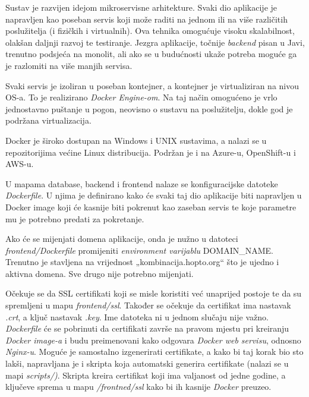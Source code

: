 	
		
		Sustav je razvijen idejom mikroservisne arhitekture. Svaki dio aplikacije je napravljen kao poseban servis koji može raditi na jednom ili na više različitih poslužitelja (i fizičkih i virtualnih). Ova tehnika omogućuje visoku skalabilnost, olakšan daljnji razvoj te testiranje. Jezgra aplikacije, točnije  \textit{backend} pisan u Javi, trenutno podsjeća na monolit, ali ako se u budućnosti ukaže potreba moguće ga je razlomiti na više manjih servisa. 

		Svaki servis je izoliran u poseban kontejner, a kontejner je virtualiziran na nivou OS-a. To je realizirano  \textit{Docker Engine-om}. Na taj način omogućeno je vrlo jednostavno puštanje u pogon, neovisno o sustavu na poslužitelju, dokle god je podržana virtualizacija. 

		Docker je široko dostupan na Windows i UNIX sustavima, a nalazi se u repozitorijima većine Linux distribucija. Podržan je i na Azure-u, OpenShift-u i AWS-u.\\
		
		
		
	
		U mapama database, backend i frontend nalaze se konfiguracijske datoteke  \textit{Dockerfile}. U njima je definirano kako će svaki taj dio aplikacije biti napravljen u Docker image koji će kasnije biti pokrenut kao zaseban servis te koje parametre mu je potrebno predati za pokretanje. 
			
			Ako će se mijenjati domena aplikacije, onda je nužno u datoteci  \textit{frontend/Dockerfile} promijeniti  \textit{environment varijablu} DOMAIN\_NAME. Trenutno je stavljena na vrijednost „kombinacija.hopto.org“ što je ujedno i aktivna domena. Sve drugo nije potrebno mijenjati.
			
			
Očekuje se da SSL certifikati koji se misle koristiti već unaprijed postoje te da su spremljeni u mapu \textit{frontend/ssl}. Također se očekuje da certifikat ima nastavak \textit{.crt}, a ključ nastavak \textit{.key}. Ime datoteka ni u jednom slučaju nije važno. \textit{Dockerfile} će se pobrinuti da certifikati završe na pravom mjestu pri kreiranju \textit{Docker image-a} i budu preimenovani kako odgovara \textit{Docker web servisu}, odnosno \textit{Nginx-u}. Moguće je samostalno izgenerirati certifikate, a kako bi taj korak bio sto lakši, napravljana je i skripta koja automatski generira certifikate (nalazi se u mapi \textit{scripts/)}. Skripta kreira certifikat koji ima valjanost od jedne godine, a ključeve sprema u mapu \textit{/frontned/ssl} kako bi ih kasnije \textit{Docker} preuzeo.
			
